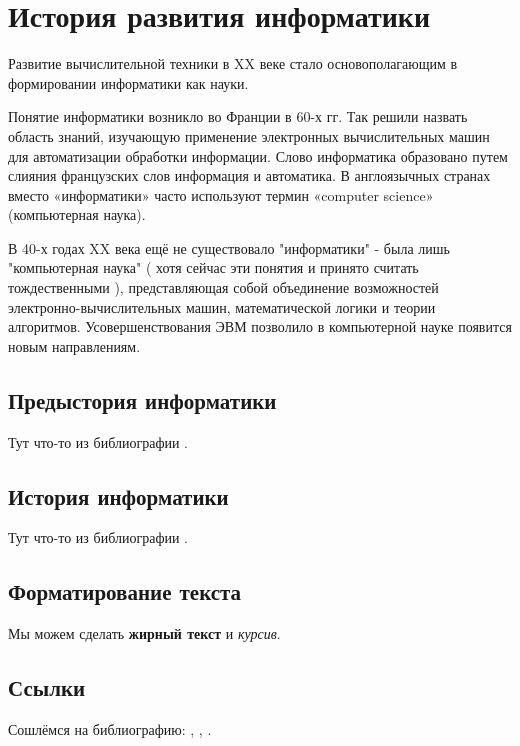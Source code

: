 \chapter{История развития информатики} \label{chapt1}

Развитие вычислительной техники в XX веке стало основополагающим в  формировании информатики как науки.

Понятие информатики возникло  во Франции в 60-х гг. Так решили назвать область знаний, изучающую применение электронных вычислительных машин для автоматизации обработки информации. Слово информатика образовано путем слияния французских слов информация и автоматика. В англоязычных странах вместо «информатики» часто используют термин «computer science» (компьютерная наука).

В 40-х годах XX века ещё не существовало "информатики" - была лишь "компьютерная наука" ( хотя сейчас эти понятия и принято считать тождественными ), представляющая собой объединение возможностей электронно-вычислительных машин, математической логики и теории алгоритмов. Усовершенствования ЭВМ позволило в компьютерной науке появится новым направлениям.  \cite{3}


\section{Предыстория информатики} \label{sect1_1}

Тут что-то из библиографии \cite{bib102}. 

\section{История информатики} \label{sect1_2}

Тут что-то из библиографии \cite{bib102}. 

\section{Форматирование текста} \label{sect1_7}

Мы можем сделать \textbf{жирный текст} и \textit{курсив}.


\section{Ссылки} \label{sect1_8}
Сошлёмся на библиографию: \cite{bib1}, \cite{bib2}, \cite{bib3,bib4,bib5}.

